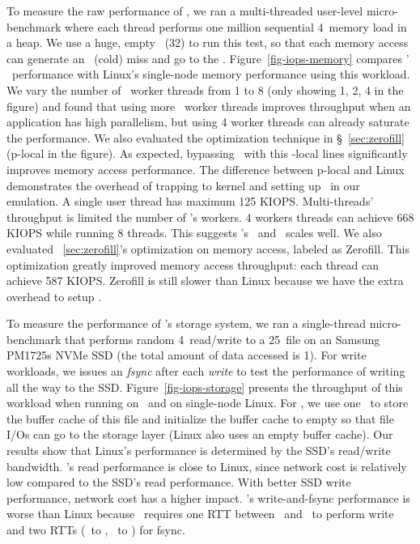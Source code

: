 \documentclass[10pt,times,twocolumn]{z2-article}
\begin{document}
{{{{{{{
To measure the raw performance of \mcomponent, we ran a multi-threaded user-level micro-benchmark 
where each thread performs one million sequential 4\KB\ memory load in a heap.
We use a huge, empty \excache\ (32\GB) to run this test, 
so that each memory access can generate an \excache\ (cold) miss and go to the \mcomponent.
Figure~\ref{fig-iops-memory} compares \lego' \mcomponent\ performance 
with Linux's single-node memory performance using this workload.
We vary the number of \mcomponent\ worker threads from 1 to 8 (only showing 1, 2, 4 in the figure)
and found that using more \mcomponent\ worker threads improves throughput when an application has high parallelism,
but using 4 worker threads can already saturate the performance.
We also evaluated the optimization technique in \S~\ref{sec:zerofill} (p-local in the figure).
As expected, bypassing \mcomponent\ with this \pcomponent-local lines significantly 
improves memory access performance.
The difference between p-local and Linux demonstrates the overhead of trapping to kernel and setting up \excache\ in our emulation.
A single user thread has maximum 125 KIOPS.
Multi-threads' throughput is limited the number of \mcomponent's workers.
4 workers threads can achieve 668 KIOPS while running 8 threads. This
suggests \lego's \excache\ and \mcomponent\ scales well.
We also evaluated ~\ref{sec:zerofill}'s optimization on memory access, labeled
as Zerofill. This optimization greatly improved memory access throughput: each
thread can achieve 587 KIOPS. Zerofill is still slower than Linux because we
have the extra overhead to setup \excache.
\fi

To measure the performance of \lego's storage system, we ran a single-thread micro-benchmark 
that performs random 4\KB\ read/write to a 25\GB\ file on an Samsung PM1725s NVMe SSD (the total amount of data accessed is 1\GB).
For write workloads, we issues an {\em fsync} after each {\em write} to test the performance of writing all the way to the SSD.
Figure~\ref{fig-iops-storage} presents the throughput of this workload when running on \lego\ and on single-node Linux.
For \lego, we use one \mcomponent\ to store the buffer cache of this file and initialize the buffer cache to empty
so that file I/Os can go to the storage layer (Linux also uses an empty buffer cache).
Our results show that Linux's performance is determined by the SSD's read/write bandwidth.
\lego's read performance is close to Linux, since network cost is relatively low compared to the SSD's read performance.
With better SSD write performance, network cost has a higher impact.
\lego's write-and-fsync performance is worse than Linux because
\lego\ requires one RTT between \pcomponent\ and \mcomponent\ to perform write 
and two RTTs (\pcomponent\ to \mcomponent, \mcomponent\ to \scomponent) for fsync.

}}}}}}}
\end{document}
